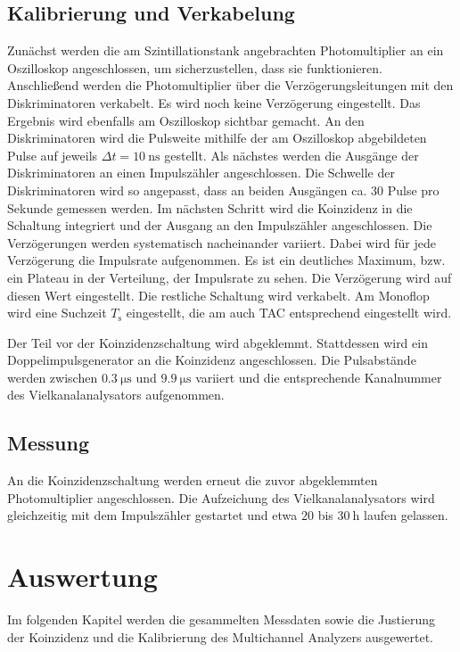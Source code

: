 \subsection{Kalibrierung und Verkabelung}
Zunächst werden die am Szintillationstank angebrachten Photomultiplier an ein Oszilloskop angeschlossen, um sicherzustellen, dass sie funktionieren.
Anschließend werden die Photomultiplier über die Verzögerungsleitungen mit den Diskriminatoren verkabelt. Es wird noch keine Verzögerung eingestellt. Das Ergebnis wird ebenfalls am Oszilloskop sichtbar gemacht. An den Diskriminatoren wird die Pulsweite mithilfe der am Oszilloskop abgebildeten Pulse auf jeweils $\Delta t = \SI{10}{\nano\second}$ gestellt.
Als nächstes werden die Ausgänge der Diskriminatoren an einen Impulszähler angeschlossen. Die Schwelle der Diskriminatoren wird so angepasst, dass an beiden Ausgängen ca. $\num{30}$ Pulse pro Sekunde gemessen werden.
Im nächsten Schritt wird die Koinzidenz in die Schaltung integriert und der Ausgang an den Impulszähler angeschlossen. Die Verzögerungen werden systematisch nacheinander variiert. Dabei wird für jede Verzögerung die Impulsrate aufgenommen. Es ist ein deutliches Maximum, bzw. ein Plateau in der Verteilung, der Impulsrate zu sehen. Die Verzögerung wird auf diesen Wert eingestellt.
Die restliche Schaltung wird verkabelt. 
Am Monoflop wird eine Suchzeit $T_\text{s}$ eingestellt, die am auch TAC entsprechend eingestellt wird.

Der Teil vor der Koinzidenzschaltung wird abgeklemmt. Stattdessen wird ein Doppelimpulsgenerator an die Koinzidenz angeschlossen.
Die Pulsabstände werden zwischen $\SI{0.3}{\micro\second}$ und $\SI{9.9}{\micro\second}$ variiert und die entsprechende Kanalnummer des Vielkanalanalysators aufgenommen.

\subsection{Messung}
An die Koinzidenzschaltung werden erneut die zuvor abgeklemmten Photomultiplier angeschlossen. Die Aufzeichung des Vielkanalanalysators wird gleichzeitig mit dem Impulszähler gestartet und etwa $\num{20}$ bis $\SI{30}{\hour}$ laufen gelassen. %

\newpage
\section{Auswertung}
Im folgenden Kapitel werden die gesammelten Messdaten sowie die Justierung der Koinzidenz und 
die Kalibrierung des Multichannel Analyzers ausgewertet.


